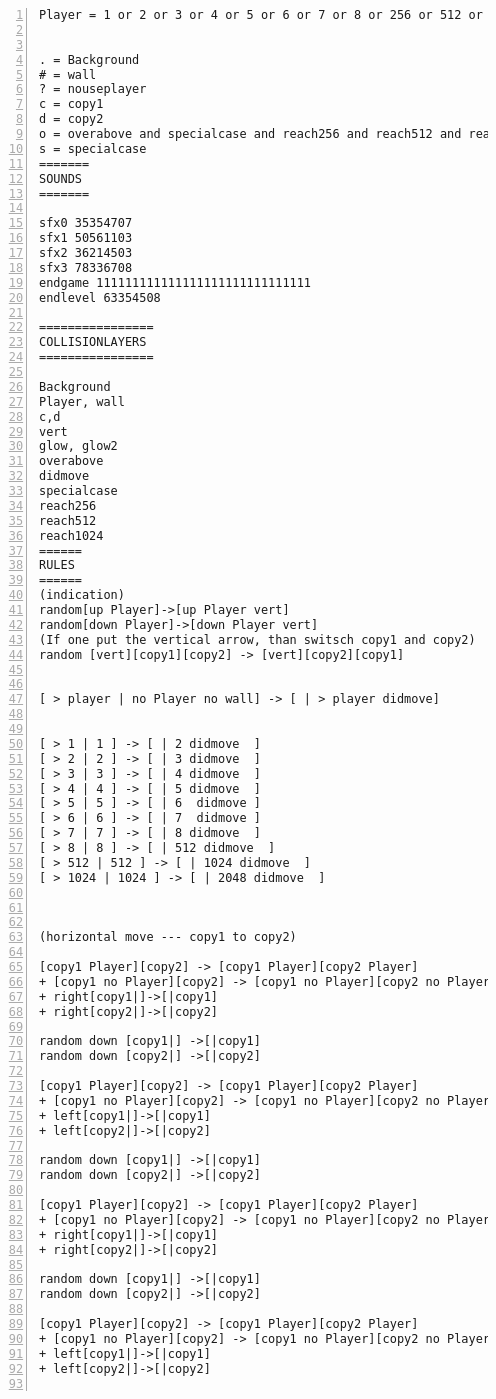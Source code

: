 \documentclass[11pt]{amsart}
\begin{document}
\begin{lstlisting}[numbers=left,numberstyle=\tiny,numbersep=10pt]
Player = 1 or 2 or 3 or 4 or 5 or 6 or 7 or 8 or 256 or 512 or 1024 or 2048 or nouseplayer


. = Background
# = wall
? = nouseplayer
c = copy1
d = copy2
o = overabove and specialcase and reach256 and reach512 and reach1024
s = specialcase
=======
SOUNDS
=======

sfx0 35354707
sfx1 50561103
sfx2 36214503
sfx3 78336708
endgame 111111111111111111111111111111
endlevel 63354508

================
COLLISIONLAYERS
================

Background
Player, wall
c,d
vert
glow, glow2
overabove
didmove
specialcase
reach256
reach512
reach1024
======
RULES
======
(indication)
random[up Player]->[up Player vert]
random[down Player]->[down Player vert]
(If one put the vertical arrow, than switsch copy1 and copy2)
random [vert][copy1][copy2] -> [vert][copy2][copy1]


[ > player | no Player no wall] -> [ | > player didmove] 


[ > 1 | 1 ] -> [ | 2 didmove  ] 
[ > 2 | 2 ] -> [ | 3 didmove  ] 
[ > 3 | 3 ] -> [ | 4 didmove  ] 
[ > 4 | 4 ] -> [ | 5 didmove  ] 
[ > 5 | 5 ] -> [ | 6  didmove ] 
[ > 6 | 6 ] -> [ | 7  didmove ] 
[ > 7 | 7 ] -> [ | 8 didmove  ] 
[ > 8 | 8 ] -> [ | 512 didmove  ] 
[ > 512 | 512 ] -> [ | 1024 didmove  ]
[ > 1024 | 1024 ] -> [ | 2048 didmove  ]



(horizontal move --- copy1 to copy2)

[copy1 Player][copy2] -> [copy1 Player][copy2 Player]
+ [copy1 no Player][copy2] -> [copy1 no Player][copy2 no Player]
+ right[copy1|]->[|copy1]
+ right[copy2|]->[|copy2]

random down [copy1|] ->[|copy1]
random down [copy2|] ->[|copy2]

[copy1 Player][copy2] -> [copy1 Player][copy2 Player]
+ [copy1 no Player][copy2] -> [copy1 no Player][copy2 no Player]
+ left[copy1|]->[|copy1]
+ left[copy2|]->[|copy2]

random down [copy1|] ->[|copy1]
random down [copy2|] ->[|copy2]

[copy1 Player][copy2] -> [copy1 Player][copy2 Player]
+ [copy1 no Player][copy2] -> [copy1 no Player][copy2 no Player]
+ right[copy1|]->[|copy1]
+ right[copy2|]->[|copy2]

random down [copy1|] ->[|copy1]
random down [copy2|] ->[|copy2]

[copy1 Player][copy2] -> [copy1 Player][copy2 Player]
+ [copy1 no Player][copy2] -> [copy1 no Player][copy2 no Player]
+ left[copy1|]->[|copy1]
+ left[copy2|]->[|copy2]


\end{lstlisting}
\end{document}
